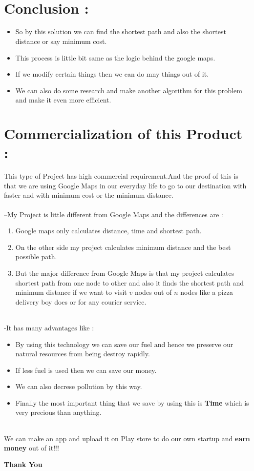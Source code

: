 \documentclass{article}
\begin{document}
    \\ \\
\section{Conclusion :}
\begin{itemize}
    \item So by this solution we can find the shortest path and also the shortest distance or say minimum cost.
    \item This process is little bit same as the logic behind the google maps.
    \item If we modify certain things then we can do mny things out of it.
    \item We can also do some research and make another algorithm for this problem and make it even more efficient. 
\end{itemize}
\newpage 
\section{Commercialization of this Product :}
This type of Project has high commercial requirement.And the proof of this is that we are using Google Maps in our everyday life to go
to our destination with faster and with minimum cost or the minimum distance.\\ \\
--My Project is little different from Google Maps and the differences are : 
\begin{enumerate}
    \item Google maps only calculates distance, time and shortest path.
    \item On the other side my project calculates minimum distance and the best possible path.
    \item But the major difference from Google Maps is that my project calculates shortest path from one node to other and also it finds the shortest path and minimum distance if we want to visit $v$ nodes out of $n$ nodes like a pizza delivery boy does or for any courier service.
\end{enumerate}
\\
-It has many advantages like :
\begin{itemize}
    \item By using this technology we can save our fuel and hence we preserve our natural resources from being destroy rapidly.
    \item If less fuel is used then we can save our money.
    \item We can also decrese pollution by this way.
    \item Finally the most important thing that we save by using this is \textbf{Time} which is very precious than anything.
\end{itemize}\\
We can make an app and upload it on Play store to do our own startup and \textbf{earn money} out of it!!!



\centering
\textbf{Thank You}
\end{document}
